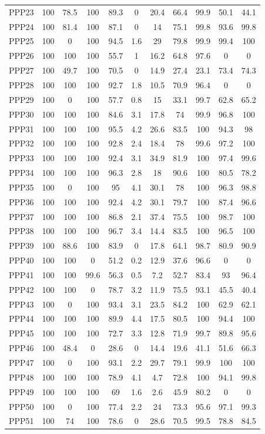\documentclass[authoryearcitations]{UoYCSproject}
\begin{document}
\begin{appendices}
\begin{table}
\begin{tabular}{|l|c|c|c|c|c|c|c|c|c|c}
PPP23&100&78.5&100&89.3&0&20.4&66.4&99.9&50.1&44.1\\
PPP24&100&81.4&100&87.1&0&14&75.1&99.8&93.6&99.8\\
PPP25&100&0&100&94.5&1.6&29&79.8&99.9&99.4&100\\
PPP26&100&100&100&55.7&1&16.2&64.8&97.6&0&0\\
PPP27&100&49.7&100&70.5&0&14.9&27.4&23.1&73.4&74.3\\
PPP28&100&100&100&92.7&1.8&10.5&70.9&96.4&0&0\\
PPP29&100&0&100&57.7&0.8&15&33.1&99.7&62.8&65.2\\
PPP30&100&100&100&84.6&3.1&17.8&74&99.9&96.8&100\\
PPP31&100&100&100&95.5&4.2&26.6&83.5&100&94.3&98\\
PPP32&100&100&100&92.8&2.4&18.4&78&99.6&97.2&100\\
PPP33&100&100&100&92.4&3.1&34.9&81.9&100&97.4&99.6\\
PPP34&100&100&100&96.3&2.8&18&90.6&100&80.5&78.2\\
PPP35&100&0&100&95&4.1&30.1&78&100&96.3&98.8\\
PPP36&100&100&100&92.4&4.2&30.1&79.7&100&87.4&96.6\\
PPP37&100&100&100&86.8&2.1&37.4&75.5&100&98.7&100\\
PPP38&100&100&100&96.7&3.4&14.4&83.5&100&96.5&100\\
PPP39&100&88.6&100&83.9&0&17.8&64.1&98.7&80.9&90.9\\
PPP40&100&100&0&51.2&0.2&12.9&37.6&96.6&0&0\\
PPP41&100&100&99.6&56.3&0.5&7.2&52.7&83.4&93&96.4\\
PPP42&100&100&0&78.7&3.2&11.9&75.5&93.1&45.5&40.4\\
PPP43&100&0&100&93.4&3.1&23.5&84.2&100&62.9&62.1\\
PPP44&100&100&100&89.9&4.4&17.5&80.5&100&94.4&100\\
PPP45&100&100&100&72.7&3.3&12.8&71.9&99.7&89.8&95.6\\
PPP46&100&48.4&0&28.6&0&14.4&19.6&41.1&51.6&66.3\\
PPP47&100&0&100&93.1&2.2&29.7&79.1&99.9&100&100\\
PPP48&100&100&100&78.9&4.1&4.7&72.8&100&94.1&99.8\\
PPP49&100&100&100&69&1.6&2.6&45.9&80.2&0&0\\
PPP50&100&0&100&77.4&2.2&24&73.3&95.6&97.1&99.3\\
PPP51&100&74&100&78.6&0&28.6&70.5&99.5&78.8&84.5\\

\end{tabular}
\end{table}
\end{appendices}
\end{document}

